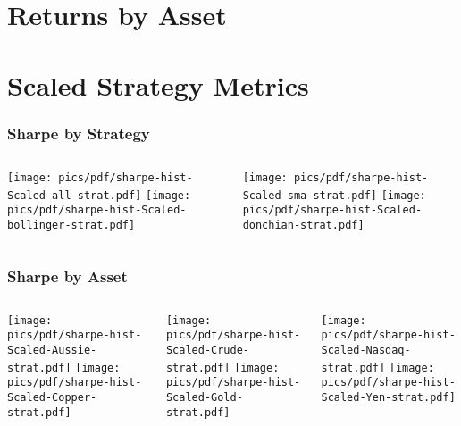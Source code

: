 \documentclass[9pt]{beamer}
\begin{document}
\section{Returns by Asset} 

\section{Scaled Strategy Metrics} 
\begin{frame}
    \frametitle{Sharpe by Strategy}
    \begin{columns}
    \begin{column}{.5\textwidth}
    \texttt{[image: pics/pdf/sharpe-hist-Scaled-all-strat.pdf]}
    \texttt{[image: pics/pdf/sharpe-hist-Scaled-bollinger-strat.pdf]}
    \end{column}
    \begin{column}{.5\textwidth}
    \texttt{[image: pics/pdf/sharpe-hist-Scaled-sma-strat.pdf]}
    \texttt{[image: pics/pdf/sharpe-hist-Scaled-donchian-strat.pdf]}
    \end{column}
    \end{columns}
\end{frame}
\begin{frame}
    \frametitle{Sharpe by Asset}
    \begin{columns}
    \begin{column}{.3\textwidth}
    \texttt{[image: pics/pdf/sharpe-hist-Scaled-Aussie-strat.pdf]}
    \texttt{[image: pics/pdf/sharpe-hist-Scaled-Copper-strat.pdf]}
    \end{column}
    \begin{column}{.3\textwidth}
    \texttt{[image: pics/pdf/sharpe-hist-Scaled-Crude-strat.pdf]}
    \texttt{[image: pics/pdf/sharpe-hist-Scaled-Gold-strat.pdf]}
    \end{column}
    \begin{column}{.3\textwidth}
    \texttt{[image: pics/pdf/sharpe-hist-Scaled-Nasdaq-strat.pdf]}
    \texttt{[image: pics/pdf/sharpe-hist-Scaled-Yen-strat.pdf]}
    \end{column}
    \end{columns}
\end{frame}
\end{document}
